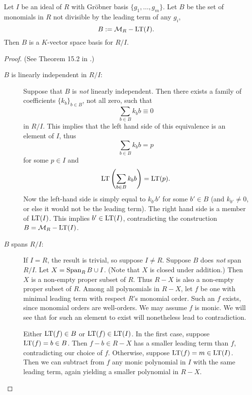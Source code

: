 \begin{theorem}
  Let $I$ be an ideal of $R$ with Gr\"obner basis $\{ g_1, \ldots, g_m \}$.
  Let $B$ be the set of monomials in $R$ not divisible by the leading term of any $g_i$,
    \[ B := \mathcal{M}_R - \operatorname{LT}(I). \]
  Then $B$ is a $K$-vector space basis for $R/I$.
\end{theorem}
\begin{proof}
  (See Theorem 15.2 in \cite{eisenbud95}.)
  \begin{description}
    \item [$B$ is linearly independent in $R/I$:]
      Suppose that $B$ is \emph{not} linearly independent.
      Then there exists a family of coefficients $\{k_b\}_{b \in B}$, not all zero, such that
        \[ \sum_{b \in B} k_b b \equiv 0 \]
      in $R/I$.
      This implies that the left hand side of this equivalence is an element of $I$,
      thus
        \[ \sum_{b \in B} k_b b = p \]
      for some $p \in I$ and
        \[ \operatorname{LT}\left(\sum_{b \in B} k_b b\right) = \operatorname{LT}(p). \]
      Now the left-hand side is simply equal to $k_{b'}b'$ for some $b' \in B$
      (and $k_{b'} \neq 0$, or else it would not be the leading term).
      The right hand side is a member of $\operatorname{LT}(I)$.
      This implies $b' \in \operatorname{LT}(I)$, contradicting the construction $B = \mathcal{M}_R - \operatorname{LT}(I)$.
      
    \item [$B$ spans $R/I$:]
      If $I = R$, the result is trivial, so suppose $I \neq R$. 
      Suppose $B$ does \emph{not} span $R/I$.
      Let $X = \operatorname{Span}_R B \cup I$.
      (Note that $X$ is closed under addition.)
      Then $X$ is a non-empty proper subset of $R$.
      Thus $R - X$ is also a non-empty proper subset of $R$.
      Among all polynomials in $R - X$, let $f$ be one with minimal leading term with respect $R$'s monomial order.
      Such an $f$ exists, since monomial orders are well-orders.
      We may assume $f$ is monic.
      We will see that for such an element to exist will nonetheless lead to contradiction.

      \begin{center}
      \end{center}
      
      Either $\operatorname{LT}(f) \in B$ or $\operatorname{LT}(f) \in \operatorname{LT}(I)$.
      In the first case, suppose $\operatorname{LT}(f) = b \in B$.
      Then $f - b \in R - X$ has a smaller leading term than $f$,
      contradicting our choice of $f$.
      Otherwise, suppose $\operatorname{LT}(f) = m \in \operatorname{LT}(I)$.
      Then we can subtract from $f$ any monic polynomial in $I$ with the same leading term,
      again yielding a smaller polynomial in $R - X$.
  \end{description}
\end{proof}

